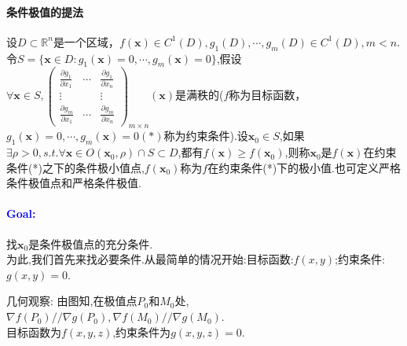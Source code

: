 \documentclass[UTF8]{ctexart}
\newcommand{\p}[2]{\frac{\partial #1}{\partial #2}}
\newcommand{\x}{\boldsymbol{x}}
\begin{document}
    \paragraph{条件极值的提法}设$D\subset\mathbb{R}^n$是一个区域，$f(\x)\in C^1(D),g_1(D),\cdots,g_m(D)\in C^1(D),m<n$.令$S=\{\x\in D:g_1(\x)=0,\cdots,g_m(\x)=0\}$,假设$\forall\x\in S,\begin{pmatrix}
        \p{g_1}{x_1}&\cdots&\p{g_1}{x_n}\\
        \vdots&&\vdots\\
        \p{g_m}{x_1}&\cdots&\p{g_m}{x_n}
    \end{pmatrix}_{m\times n}(\x)$是满秩的($f$称为目标函数，$g_1(\x)=0,\cdots,g_m(\x)=0(*)$称为约束条件).设$\x_0\in S$,如果$\exists\rho>0,s.t.\forall\x\in O(\x_0,\rho)\cap S\subset D$,都有$f(\x)\ge f(\x_0)$,则称$\x_0$是$f(\x)$在约束条件(*)之下的条件极小值点,$f(\x_0)$称为$f$在约束条件(*)下的极小值.也可定义严格条件极值点和严格条件极值.

    \paragraph{\textcolor{blue}{Goal:}}找$\x_0$是条件极值点的充分条件.\\
    为此,我们首先来找必要条件.从最简单的情况开始:目标函数:$f(x,y)$;约束条件:$g(x,y)=0$.

    几何观察:
    由图知,在极值点$P_0$和$M_0$处,$\nabla f(P_0)//\nabla g(P_0),\nabla f(M_0)//\nabla g(M_0)$.\\
    目标函数为$f(x,y,z)$,约束条件为$g(x,y,z)=0$.
    
\end{document}
